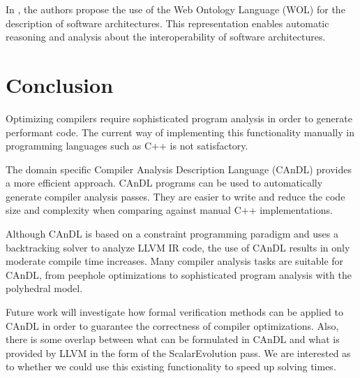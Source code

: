     In \cite{Yuan:2017:TOS:3101282.3101287}, the authors propose the use of the
    Web Ontology Language (WOL) for the description of software architectures.
    This representation enables automatic reasoning and analysis about the
    interoperability of software architectures.

\section{Conclusion}

    Optimizing compilers require sophisticated program analysis in order to
    generate performant code.
    The current way of implementing this functionality manually in programming
    languages such as C++ is not satisfactory.

    The domain specific Compiler Analysis Description Language (CAnDL) provides
    a more efficient approach.
    CAnDL programs can be used to automatically generate compiler analysis
    passes.
    They are easier to write and reduce the code size and complexity when
    comparing against manual C++ implementations.

    Although CAnDL is based on a constraint programming paradigm and uses a
    backtracking solver to analyze LLVM IR code, the use of CAnDL results in
    only moderate compile time increases.
    Many compiler analysis tasks are suitable for CAnDL, from
    peephole optimizations to sophisticated program analysis with the polyhedral
    model.

    Future work will investigate how formal verification methods can be
    applied to CAnDL in order to guarantee the correctness of compiler
    optimizations.
    Also, there is some overlap between what can be formulated in CAnDL and what
    is provided by LLVM in the form of the ScalarEvolution pass.
    We are interested as to whether we could use this existing functionality to
    speed up solving times.